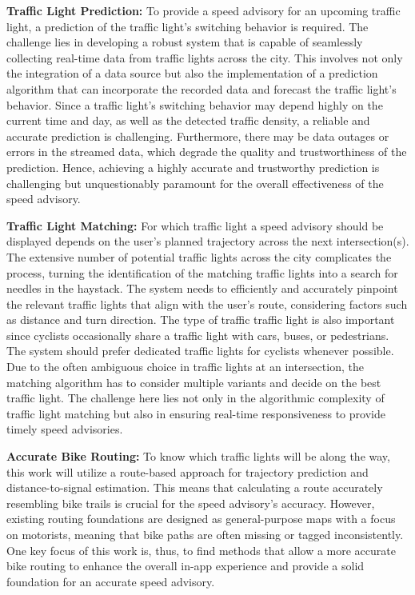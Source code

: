 \textbf{Traffic Light Prediction:} To provide a speed advisory for an upcoming traffic light, a prediction of the traffic light's switching behavior is required. The challenge lies in developing a robust system that is capable of seamlessly collecting real-time data from traffic lights across the city. This involves not only the integration of a data source but also the implementation of a prediction algorithm that can incorporate the recorded data and forecast the traffic light's behavior. Since a traffic light's switching behavior may depend highly on the current time and day, as well as the detected traffic density, a reliable and accurate prediction is challenging. Furthermore, there may be data outages or errors in the streamed data, which degrade the quality and trustworthiness of the prediction. Hence, achieving a highly accurate and trustworthy prediction is challenging but unquestionably paramount for the overall effectiveness of the speed advisory.

\textbf{Traffic Light Matching:} For which traffic light a speed advisory should be displayed depends on the user's planned trajectory across the next intersection(s). The extensive number of potential traffic lights across the city complicates the process, turning the identification of the matching traffic lights into a search for needles in the haystack. The system needs to efficiently and accurately pinpoint the relevant traffic lights that align with the user's route, considering factors such as distance and turn direction. The type of traffic traffic light is also important since cyclists occasionally share a traffic light with cars, buses, or pedestrians. The system should prefer dedicated traffic lights for cyclists whenever possible. Due to the often ambiguous choice in traffic lights at an intersection, the matching algorithm has to consider multiple variants and decide on the best traffic light. The challenge here lies not only in the algorithmic complexity of traffic light matching but also in ensuring real-time responsiveness to provide timely speed advisories.

\textbf{Accurate Bike Routing:} To know which traffic lights will be along the way, this work will utilize a route-based approach for trajectory prediction and distance-to-signal estimation. This means that calculating a route accurately resembling bike trails is crucial for the speed advisory's accuracy. However, existing routing foundations are designed as general-purpose maps with a focus on motorists, meaning that bike paths are often missing or tagged inconsistently. One key focus of this work is, thus, to find methods that allow a more accurate bike routing to enhance the overall in-app experience and provide a solid foundation for an accurate speed advisory.

